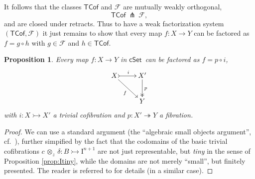 \documentclass[12pt]{article}
\newcommand{\cSet}{\ensuremath{\mathsf{cSet}}}
\newcommand{\mono}{\ensuremath{\rightarrowtail}}
\newcommand{\ra}{\ensuremath{\rightarrow}}
\newcommand{\onto}{\ensuremath{\twoheadrightarrow}}
\newcommand{\I}{\ensuremath{\mathrm{I}}}
\newtheorem{proposition}[theorem]{Proposition}
\theoremstyle{remark}
\theoremstyle{definition}
\begin{document}
It follows that the classes $\mathsf{TCof}$ and $\mathcal{F}$ are mutually weakly orthogonal,
\[
\mathsf{TCof}\ {\pitchfork}\ \mathcal{F},
\]
and are closed under retracts.  Thus to have a weak factorization system $(\mathsf{TCof}, \mathcal{F})$ it just remains to show that every map $f: X\ra Y$ can be factored as $f  = g\circ h$ with $g\in \mathcal{F}$ and $h\in \mathsf{TCof}$.

\begin{proposition}
Every map $f: X\ra Y$ in \cSet\ can be factored as $f  = p\circ i$,
\begin{equation}%
\xymatrix{
X \ar[rd]_{f} \ar@{>->}[r]^i & X'\ar@{->>}[d]^p\\
& Y
}
\end{equation}
with $i: X\mono X'$ a trivial cofibration and $p: X'\onto Y$ a fibration.
\end{proposition}
\begin{proof}
We can use a standard argument (the ``algebraic small objects argument'', cf.~\cite{Garner}), further simpified by the fact that the codomains of the basic trivial cofibrations $c\, \otimes_z \,\delta : B \mono \I^{n+1}$ are not just representable, but \emph{tiny} in the sense of Proposition \ref{prop:Itiny}, while the domains are not merely ``small'', but finitely presented.  The reader is referred to \cite{A:cubical} for details (in a similar case).
\end{proof}
%
\end{document}
